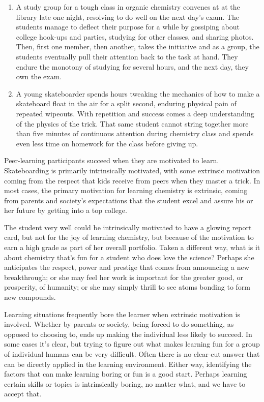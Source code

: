 \begin{enumerate}
\item
  A study group for a tough class in organic chemistry convenes at at
  the library late one night, resolving to do well on the next day's
  exam. The students manage to deflect their purpose for a while by
  gossiping about college hook-ups and parties, studying for other
  classes, and sharing photos. Then, first one member, then another,
  takes the initiative and as a group, the students eventually pull
  their attention back to the task at hand. They endure the monotony of
  studying for several hours, and the next day, they own the exam.
\item
  A young skateboarder spends hours tweaking the mechanics of how to
  make a skateboard float in the air for a split second, enduring
  physical pain of repeated wipeouts. With repetition and success comes
  a deep understanding of the physics of the trick. That same student
  cannot string together more than five minutes of continuous attention
  during chemistry class and spends even less time on homework for the
  class before giving up.
\end{enumerate}
Peer-learning participants succeed when they are motivated to learn.
Skateboarding is primarily intrinsically motivated, with some extrinsic
motivation coming from the respect that kids receive from peers when
they master a trick. In most cases, the primary motivation for learning
chemistry is extrinsic, coming from parents and society's expectations
that the student excel and assure his or her future by getting into a
top college.

The student very well could be intrinsically motivated to have a glowing
report card, but not for the joy of learning chemistry, but because of
the motivation to earn a high grade as part of her overall portfolio.
Taken a different way, what is it about chemistry that's fun for a
student who does love the science? Perhaps she anticipates the respect,
power and prestige that comes from announcing a new breakthrough; or she
may feel her work is important for the greater good, or prosperity, of
humanity; or she may simply thrill to see atoms bonding to form new
compounds.

Learning situations frequently bore the learner when extrinsic
motivation is involved. Whether by parents or society, being forced to
do something, as opposed to choosing to, ends up making the individual
less likely to succeed. In some cases it's clear, but trying to figure
out what makes learning fun for a group of individual humans can be very
difficult. Often there is no clear-cut answer that can be directly
applied in the learning environment. Either way, identifying the factors
that can make learning boring or fun is a good start. Perhaps learning
certain skills or topics is intrinsically boring, no matter what, and we
have to accept that.

